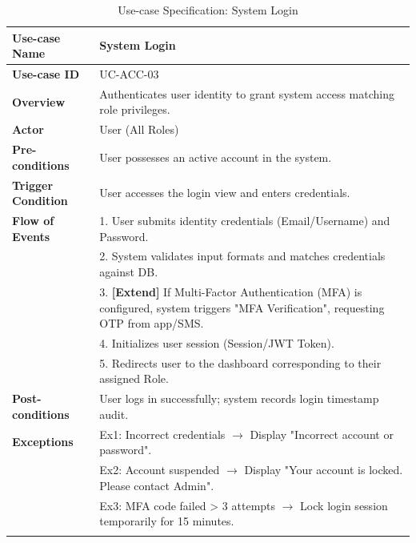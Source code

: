 \begin{longtable}{|p{3.5cm}|p{11.5cm}|}
    \hline
    \textbf{Use-case Name} & \textbf{System Login} \\
    \hline
    \textbf{Use-case ID} & UC-ACC-03 \\
    \hline
    \textbf{Overview} & Authenticates user identity to grant system access matching role privileges. \\
    \hline
    \textbf{Actor} & User (All Roles) \\
    \hline
    \textbf{Pre-conditions} & User possesses an active account in the system. \\
    \hline
    \textbf{Trigger Condition} & User accesses the login view and enters credentials. \\
    \hline
    \textbf{Flow of Events} & 
    1. User submits identity credentials (Email/Username) and Password.\\ 
 & 
    2. System validates input formats and matches credentials against DB.\\ 
 & 
    3. \textbf{[Extend]} If Multi-Factor Authentication (MFA) is configured, system triggers "MFA Verification", requesting OTP from app/SMS.\\ 
 & 
    4. Initializes user session (Session/JWT Token).\\ 
 & 
    5. Redirects user to the dashboard corresponding to their assigned Role. \\
    \hline
    \textbf{Post-conditions} & User logs in successfully; system records login timestamp audit. \\
    \hline
    \textbf{Exceptions} & 
    Ex1: Incorrect credentials $\rightarrow$ Display "Incorrect account or password".\\ 
 & 
    Ex2: Account suspended $\rightarrow$ Display "Your account is locked. Please contact Admin".\\ 
 & 
    Ex3: MFA code failed > 3 attempts $\rightarrow$ Lock login session temporarily for 15 minutes. \\
    \hline
    \caption{Use-case Specification: System Login} \\
\end{longtable}

